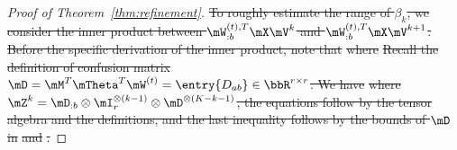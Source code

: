 \documentclass[lettersize,onecolumn,journal]{IEEEtran}
\theoremstyle{definition}
\theoremstyle{definition}
\newcommand{\of}[1]{\left(#1\right)}
\newcommand{\ang}[1]{\left\langle#1\right\rangle}
\providecommand{\DIFdeltex}[1]{{\protect\color{red}\sout{#1}}}                      %
\providecommand{\DIFdel}[1]{\texorpdfstring{\DIFdeltex{#1}}{}} %
\begin{document}
\begin{proof}[Proof of Theorem~\ref{thm:refinement}]
\DIFdel{To roughly estimate the range of $\beta_k$, we consider the inner product between $\mW_{:b}^{(t),T} \mX \mV^k$ and $\mW_{:b}^{(t),T} \mX \mV^{k+1}$. Before the specific derivation of the inner product, note that 
    }%
\DIFdel{where 
    }%
\DIFdel{Recall the definition of confusion matrix $\mD = \mM^T \mTheta^T \mW^{(t)} = \entry{D_{ab}} \in \bbR^{r \times r}$.
    We have 
    }%
\DIFdel{where $\mZ^k = \mD_{:b} \otimes \mI_r^{\otimes (k-1)} \otimes  \mD^{\otimes (K-k-1)}$, the equations follow by the tensor algebra and the definitions, and the last inequality follows by the bounds of $\mD$ in }%
\DIFdel{and }%
\DIFdel{. 
    }%


\end{proof}
\end{document}
